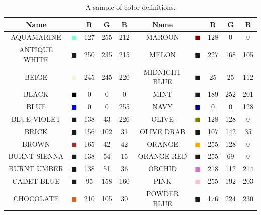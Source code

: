 \documentclass[11pt]{book}
\begin{document}
\begin{table}[p]
\begin{center}
\caption[A sample of color definitions]{A sample of color definitions.}
\label{tab:colors}
\vspace{0.1in}
\begin{tabular}{|c|c|c|c|c|c||c|c|c|c|}
\hline
Name & &  R  & G & B & Name & & R & G & B   \\ \hline \hline
{\ct AQUAMARINE} & \textcolor{AQUAMARINE} {$\blacksquare$} & 127& 255& 212& {\ct MAROON} &  \textcolor{MAROON} {$\blacksquare$} & 128& 0& 0  \\ \hline
{\ct ANTIQUE WHITE} & \textcolor{ANTIQUE WHITE} {$\blacksquare$} & 250& 235& 215& {\ct MELON} &  \textcolor{MELON} {$\blacksquare$} & 227& 168& 105  \\ \hline
{\ct BEIGE} & \textcolor{BEIGE} {$\blacksquare$} & 245& 245& 220& {\ct MIDNIGHT BLUE} &  \textcolor{MIDNIGHT BLUE} {$\blacksquare$} & 25& 25& 112  \\ \hline
{\ct BLACK} & \textcolor{BLACK} {$\blacksquare$} & 0& 0& 0& {\ct MINT} &  \textcolor{MINT} {$\blacksquare$} & 189& 252& 201  \\ \hline
{\ct BLUE} & \textcolor{BLUE} {$\blacksquare$} & 0& 0& 255& {\ct NAVY} &  \textcolor{NAVY} {$\blacksquare$} & 0& 0& 128  \\ \hline
{\ct BLUE VIOLET} & \textcolor{BLUE VIOLET} {$\blacksquare$} & 138& 43& 226& {\ct OLIVE} &  \textcolor{OLIVE} {$\blacksquare$} & 128& 128& 0  \\ \hline
{\ct BRICK} & \textcolor{BRICK} {$\blacksquare$} & 156& 102& 31& {\ct OLIVE DRAB} &  \textcolor{OLIVE DRAB} {$\blacksquare$} & 107& 142& 35  \\ \hline
{\ct BROWN} & \textcolor{BROWN} {$\blacksquare$} & 165& 42& 42& {\ct ORANGE} &  \textcolor{ORANGE} {$\blacksquare$} & 255& 128& 0  \\ \hline
{\ct BURNT SIENNA} & \textcolor{BURNT SIENNA} {$\blacksquare$} & 138& 54& 15& {\ct ORANGE RED} &  \textcolor{ORANGE RED} {$\blacksquare$} & 255& 69& 0  \\ \hline
{\ct BURNT UMBER} & \textcolor{BURNT UMBER} {$\blacksquare$} & 138& 51& 36& {\ct ORCHID} &  \textcolor{ORCHID} {$\blacksquare$} & 218& 112& 214  \\ \hline
{\ct CADET BLUE} & \textcolor{CADET BLUE} {$\blacksquare$} & 95& 158& 160& {\ct PINK} &  \textcolor{PINK} {$\blacksquare$} & 255& 192& 203  \\ \hline
{\ct CHOCOLATE} & \textcolor{CHOCOLATE} {$\blacksquare$} & 210& 105& 30& {\ct POWDER BLUE} &  \textcolor{POWDER BLUE} {$\blacksquare$} & 176& 224& 230  \\ \hline

\end{tabular}
\end{center}
\end{table}
\end{document}
